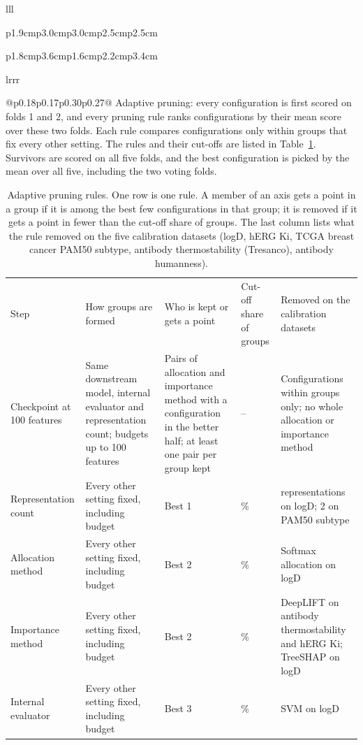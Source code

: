 \begin{table}[t]
\begin{tabular}{lll}
\begin{tabular}{p{1.9cm}p{3.0cm}p{3.0cm}p{2.5cm}p{2.5cm}}
\begin{tabular}{p{1.8cm}p{3.6cm}p{1.6cm}p{2.2cm}p{3.4cm}}
\begin{tabular}{lrrr}
\begin{tabular}{@{}p{0.18\linewidth}p{0.17\linewidth}p{0.30\linewidth}p{0.27\linewidth}@{}}
%
Adaptive pruning: every configuration is first scored on folds 1 and 2, and every pruning rule ranks configurations by their mean score over these two folds. Each rule compares configurations only within groups that fix every other setting. The rules and their cut-offs are listed in Table~\ref{tab:pruning_rules}. Survivors are scored on all five folds, and the best configuration is picked by the mean over all five, including the two voting folds.
\caption{Adaptive pruning rules. One row is one rule. A member of an axis gets a point in a group if it is among the best few configurations in that group; it is removed if it gets a point in fewer than the cut-off share of groups. The last column lists what the rule removed on the five calibration datasets (logD, hERG Ki, TCGA breast cancer PAM50 subtype, antibody thermostability (Tresanco), antibody humanness).}
\label{tab:pruning_rules}
\begin{tabular}{@{}>{\raggedright\arraybackslash}p{2.3cm}>{\raggedright\arraybackslash}p{3.4cm}>{\raggedright\arraybackslash}p{2.6cm}>{\raggedright\arraybackslash}p{1.4cm}>{\raggedright\arraybackslash}p{3.3cm}@{}}
Step & How groups are formed & Who is kept or gets a point & Cut-off share of groups & Removed on the calibration datasets \\
Checkpoint at 100 features & Same downstream model, internal evaluator and representation count; budgets up to 100 features & Pairs of allocation and importance method with a configuration in the better half; at least one pair per group kept & -- & Configurations within groups only; no whole allocation or importance method \\
Representation count & Every other setting fixed, including budget & Best 1 & 10\% & 5 representations on logD; 2 on PAM50 subtype \\
Allocation method & Every other setting fixed, including budget & Best 2 & 20\% & Softmax allocation on logD \\
Importance method & Every other setting fixed, including budget & Best 2 & 20\% & DeepLIFT on antibody thermostability and hERG Ki; TreeSHAP on logD \\
Internal evaluator & Every other setting fixed, including budget & Best 3 & 10\% & SVM on logD \\


\end{tabular}
\end{tabular}
\end{tabular}
\end{tabular}
\end{tabular}
\end{tabular}
\end{table}
